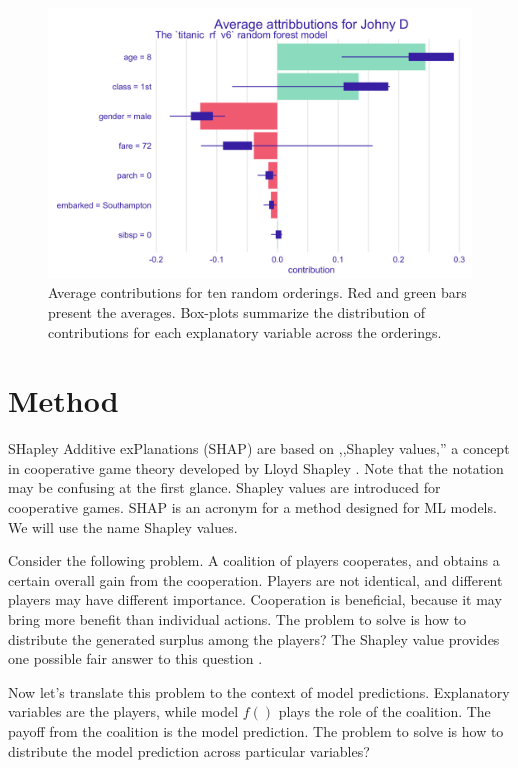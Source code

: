 \documentclass[]{krantz}
\begin{document}
\begin{figure}

{\centering \includegraphics[width=0.7\linewidth]{figure/shap_ordering} 

}

\caption{Average contributions for ten random orderings. Red and green bars present the averages. Box-plots summarize the distribution of contributions for each explanatory variable across the orderings.}\label{fig:shapOrdering}
\end{figure}

\hypertarget{SHAPMethod}{%
\section{Method}\label{SHAPMethod}}

SHapley Additive exPlanations (SHAP) are based on ,,Shapley values,'' a concept in cooperative game theory developed by Lloyd Shapley \citep{shapleybook1952}. Note that the notation may be confusing at the first glance. Shapley values are introduced for cooperative games. SHAP is an acronym for a method designed for ML models. We will use the name Shapley values.

Consider the following problem. A coalition of players cooperates, and obtains a certain overall gain from the cooperation. Players are not identical, and different players may have different importance. Cooperation is beneficial, because it may bring more benefit than individual actions. The problem to solve is how to distribute the generated surplus among the players? The Shapley value provides one possible fair answer to this question \citep{shapleybook1952}.

Now let's translate this problem to the context of model predictions. Explanatory variables are the players, while model \(f()\) plays the role of the coalition. The payoff from the coalition is the model prediction. The problem to solve is how to distribute the model prediction across particular variables?
\end{document}
